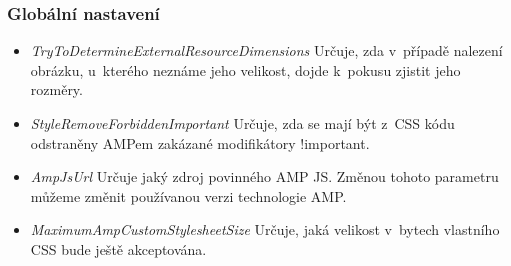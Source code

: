 \subsubsection{Globální nastavení}
\begin{itemize}
    \item \textit{TryToDetermineExternalResourceDimensions} \newline
    Určuje, zda v~případě nalezení obrázku, u~kterého neznáme jeho velikost, dojde k~pokusu zjistit jeho rozměry.
    \item \textit{StyleRemoveForbiddenImportant}\newline
    Určuje, zda se mají být z~CSS kódu odstraněny AMPem zakázané modifikátory !important.
    \item \textit{AmpJsUrl}\newline
    Určuje jaký zdroj povinného AMP JS. Změnou tohoto parametru můžeme změnit používanou verzi technologie AMP.
    \item \textit{MaximumAmpCustomStylesheetSize}\newline
    Určuje, jaká velikost v~bytech vlastního CSS bude ještě akceptována.
\end{itemize}



